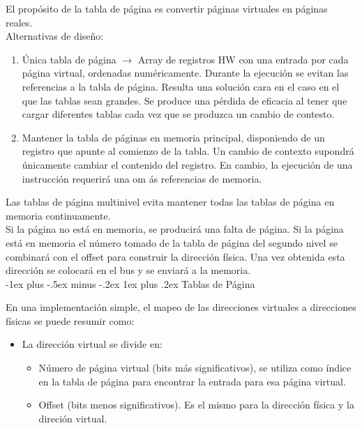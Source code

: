 \documentclass[10pt,portrait, twocolumn]{article}
\makeatletter
\renewcommand{\subsubsection}{\@startsection{subsubsection}{3}{0mm}%
                                {-1ex plus -.5ex minus -.2ex}%
                                {1ex plus .2ex}%
                                {\normalfont\small\bfseries}}
\makeatother
\begin{document}
El propósito de la tabla de página es convertir páginas virtuales en páginas reales.\\

Alternativas de diseño:

	\begin{enumerate}
		\item Única tabla de página $\rightarrow$ Array de registros HW con una entrada por cada página virtual, ordenadas numéricamente. Durante la ejecución se evitan las referencias a la tabla de página. Resulta una solución cara en el caso en el que las tablas sean grandes. Se produce una pérdida de eficacia al tener que cargar diferentes tablas cada vez que se produzca un cambio de contesto.
		\item Mantener la tabla de páginas en memoria principal, disponiendo de un registro que apunte al comienzo de la tabla. Un cambio de contexto supondrá únicamente cambiar el contenido del registro. En cambio, la ejecución de una instrucción requerirá una om ás referencias de memoria.
	\end{enumerate}
	
Las tablas de página multinivel evita mantener todas las tablas de página en memoria continuamente.\\

Si la página no está en memoria, se producirá una falta de página. Si la página está en memoria el número tomado de la tabla de página del segundo nivel se combinará con el offset para construir la dirección física. Una vez obtenida esta dirección se colocará en el bus y se enviará a la memoria.\\


\subsubsection{Tablas de Página}

En una implementación simple, el mapeo de las direcciones virtuales a direcciones físicas se puede resumir como:

	\begin{itemize}
	\item La dirección virtual se divide en:
		\begin{itemize}
		\item Número de página virtual (bits más significativos), se utiliza como índice en la tabla de página para encontrar la entrada para esa página virtual.
		\item Offset (bits menos significativos). Es el mismo para la dirección física y la direción virtual.
		\end{itemize}
	\end{itemize}
\end{document}
